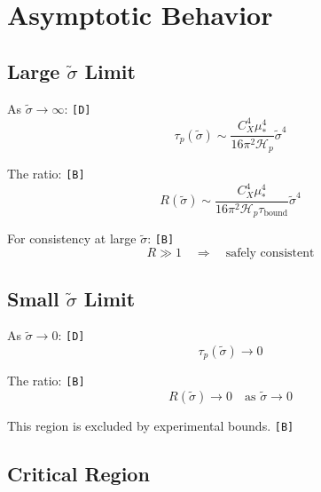 \documentclass[11pt,a4paper]{article}
\newcommand{\tagD}{\textcolor{green!50!black}{\texttt{[D]}}}
\newcommand{\tagB}{\textcolor{purple!70!black}{\texttt{[B]}}}
\theoremstyle{definition}
\begin{document}
\section{Asymptotic Behavior}
\label{sec:asymptotic}

\subsection{Large $\tilde{\sigma}$ Limit}
\label{subsec:large-sigma}

As $\tilde{\sigma} \to \infty$: \tagD{}
\begin{equation}
\label{eq:asymp-large-1}
\tau_p(\tilde{\sigma}) \sim \frac{C_X^4 \mu_*^4}{16\pi^2 \mathcal{H}_p} \tilde{\sigma}^4
\end{equation}

The ratio: \tagB{}
\begin{equation}
\label{eq:asymp-large-2}
R(\tilde{\sigma}) \sim \frac{C_X^4 \mu_*^4}{16\pi^2 \mathcal{H}_p \tau_{\text{bound}}} \tilde{\sigma}^4
\end{equation}

For consistency at large $\tilde{\sigma}$: \tagB{}
\begin{equation}
\label{eq:asymp-large-3}
R \gg 1 \quad \Rightarrow \quad \text{safely consistent}
\end{equation}

\subsection{Small $\tilde{\sigma}$ Limit}
\label{subsec:small-sigma}

As $\tilde{\sigma} \to 0$: \tagD{}
\begin{equation}
\label{eq:asymp-small-1}
\tau_p(\tilde{\sigma}) \to 0
\end{equation}

The ratio: \tagB{}
\begin{equation}
\label{eq:asymp-small-2}
R(\tilde{\sigma}) \to 0 \quad \text{as } \tilde{\sigma} \to 0
\end{equation}

This region is excluded by experimental bounds. \tagB{}

\subsection{Critical Region}
\label{subsec:critical}
\end{document}

